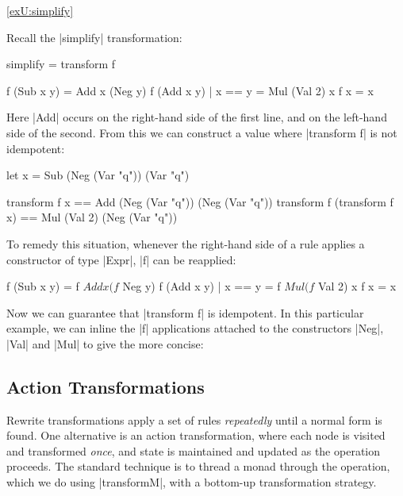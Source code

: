 \begin{examplerevisit}{\ref{exU:simplify}}

Recall the |simplify| transformation:

\begin{code}
simplify = transform f

f (Sub x y)           = Add x (Neg y)
f (Add x y) | x == y  = Mul (Val 2) x
f x                   = x
\end{code}

Here |Add| occurs on the right-hand side of the first line, and on the left-hand side of the second. From this we can construct a value where |transform f| is not idempotent:

\ignore\begin{code}
let x = Sub (Neg (Var "q")) (Var "q")

transform f x                == Add (Neg (Var "q")) (Neg (Var "q"))
transform f (transform f x)  == Mul (Val 2) (Neg (Var "q"))
\end{code}

To remedy this situation, whenever the right-hand side of a rule applies a constructor of type |Expr|, |f| can be reapplied:

\begin{code}
f (Sub x y)           = f $ Add x (f $ Neg y)
f (Add x y) | x == y  = f $ Mul (f $ Val 2) x
f x                   = x
\end{code}

Now we can guarantee that |transform f| is idempotent. In this particular example, we can inline the |f| applications attached to the constructors |Neg|, |Val| and |Mul| to give the more concise:

\codeexample
\end{examplerevisit}


\subsection{Action Transformations}

Rewrite transformations apply a set of rules \textit{repeatedly} until a normal form is found. One alternative is an action transformation, where each node is visited and transformed \textit{once}, and state is maintained and updated as the operation proceeds. The standard technique is to thread a monad through the operation, which we do using |transformM|, with a bottom-up transformation strategy.

